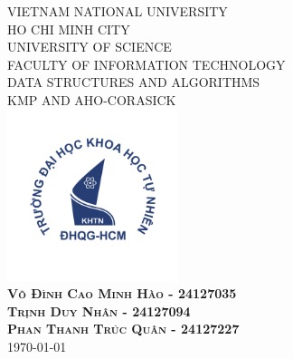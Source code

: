 \begin{titlepage}
  \begin{center}
    \vspace*{\fill}
    \textsc{\LARGE VIETNAM NATIONAL UNIVERSITY \\ HO CHI MINH CITY}\\[0.5cm]
    \textsc{\LARGE UNIVERSITY OF SCIENCE}\\[0.5cm]
    \textsc{\Large FACULTY OF INFORMATION TECHNOLOGY}\\[1.0cm]
    \textsc{\LARGE DATA STRUCTURES AND ALGORITHMS}\\[0.5cm]
    \textsc{\LARGE KMP AND AHO-CORASICK}\\[1.5cm]
    \includegraphics[width=5cm]{img/hcmus-logo.png}\\[1.5cm]
    \textsc{\large \bfseries Võ Đình Cao Minh Hào - 24127035}\\
    \textsc{\large \bfseries Trịnh Duy Nhân - 24127094}\\
    \textsc{\large \bfseries Phan Thanh Trúc Quân - 24127227}\\[1.0cm]
    \large \today
    \vspace*{\fill}
  \end{center}
\end{titlepage}